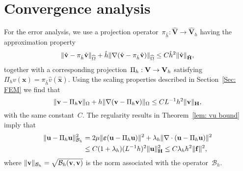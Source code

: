 \documentclass[11pt]{article}
\newcommand{\calB}{\mathcal{B}}
\newcommand{\vf}{{\bf f}}
\newcommand{\vu}{{\bf u}}
\newcommand{\vv}{{\bf v}}
\newcommand{\vV}{{\bf V}}
\newcommand{\vH}{{\bf H}}
\newcommand{\vVhat}{\mathbf{\hat V}}
\newcommand{\vHhat}{\mathbf{\hat H}}
\newcommand{\bsx}{{\boldsymbol{x}}}
\numberwithin{equation}{section}
\newcommand{\veps}{{\boldsymbol{\varepsilon}}}
\begin{document}
\section{Convergence analysis}\label{ConvAna}
For the error analysis, we use a projection
operator~$\pi_{\hat h}:\vVhat\to\vVhat_h$ having the approximation property
\[
\|\hat\vv-\pi_{\hat h}\hat\vv\|_{\widehat\Omega}
    +\hat h\|\nabla(\hat\vv-\pi_{\hat h}\hat\vv)\|_{\widehat\Omega}
    \le C\hat h^2\|\hat\vv\|_{\vHhat},
\]
together with a corresponding projection~$\Pi_h:\vV\to\vV_h$ satisfying
$\Pi_hv(\bsx)=\pi_{\hat h}\hat v(\hat\bsx)$.  Using the scaling properties
described in Section~\ref{Sec: FEM} we find that
\begin{equation} \label{projection estimate}
\|\vv-\Pi_h\vv\|_\Omega+h\|\nabla(\vv-\Pi_h\vv)\|_\Omega
    \le CL^{-1}h^2\|\vv\|_{\vH},
\end{equation}
with the same constant~$C$.
The regularity results in Theorem~\ref{lem: vu bound} imply that
\begin{equation}\label{projection estimate Bh}
\begin{aligned}
\|\vu-\Pi_h \vu\|_{\calB_h}^2&=2\mu\|\veps(\vu-\Pi_h \vu)\|^2
     +\lambda_h\|\nabla \cdot (\vu-\Pi_h \vu)\|^2\\
    &\le C(1+\lambda_h)(L^{-1}h)^2\|\vu\|_{\vH}^2
     \le C\lambda_h h^2\|\vf\|^2,
\end{aligned}
\end{equation}
where $\|\vv\|_{\calB_h}=\sqrt{\calB_h(\vv,\vv)}$ is the norm associated with
the operator~$\calB_h$.
\end{document}
